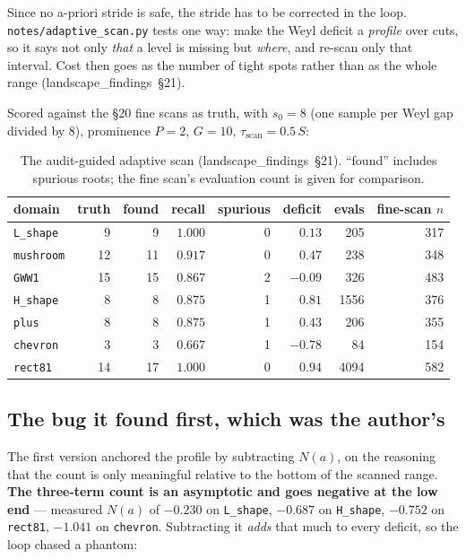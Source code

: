 \documentclass[11pt]{article}
\newcommand{\file}[1]{\texttt{#1}}
\newcommand{\lf}[1]{(landscape\_findings~\S#1)}
\begin{document}
Since no a-priori stride is safe, the stride has to be corrected in the loop.
\file{notes/adaptive\_scan.py} tests one way: make the Weyl deficit a \emph{profile} over cuts,
so it says not only \emph{that} a level is missing but \emph{where}, and re-scan only that
interval. Cost then goes as the number of tight spots rather than as the whole range \lf{21}.

Scored against the \S20 fine scans as truth, with $s_0 = 8$ (one sample per Weyl gap divided by
8), prominence $P=2$, $G=10$, $\tau_{\mathrm{scan}} = 0.5\,S$:

\begin{table}[htbp]
\centering
\caption{The audit-guided adaptive scan \lf{21}. ``found'' includes spurious roots; the fine
scan's evaluation count is given for comparison.}
\label{tab:adaptive}
\begin{tabular}{lrrrrrrr}
\toprule
domain & truth & found & recall & spurious & deficit & evals & fine-scan $n$ \\
\midrule
\file{L\_shape} &  9 &  9 & $1.000$ & 0 & $0.13$ &  205 & 317 \\
\file{mushroom} & 12 & 11 & $0.917$ & 0 & $0.47$ &  238 & 348 \\
\file{GWW1}     & 15 & 15 & $0.867$ & 2 & $-0.09$&  326 & 483 \\
\file{H\_shape} &  8 &  8 & $0.875$ & 1 & $0.81$ & 1556 & 376 \\
\file{plus}     &  8 &  8 & $0.875$ & 1 & $0.43$ &  206 & 355 \\
\file{chevron}  &  3 &  3 & $0.667$ & 1 & $-0.78$&   84 & 154 \\
\file{rect81}   & 14 & 17 & $1.000$ & 0 & $0.94$ & 4094 & 582 \\
\bottomrule
\end{tabular}
\end{table}

\subsection{The bug it found first, which was the author's}

The first version anchored the profile by subtracting $N(a)$, on the reasoning that the count is
only meaningful relative to the bottom of the scanned range. \textbf{The three-term count is an
asymptotic and goes negative at the low end} --- measured $N(a)$ of $-0.230$ on
\file{L\_shape}, $-0.687$ on \file{H\_shape}, $-0.752$ on \file{rect81}, $-1.041$ on
\file{chevron}. Subtracting it \emph{adds} that much to every deficit, so the loop chased a
phantom:
\end{document}

